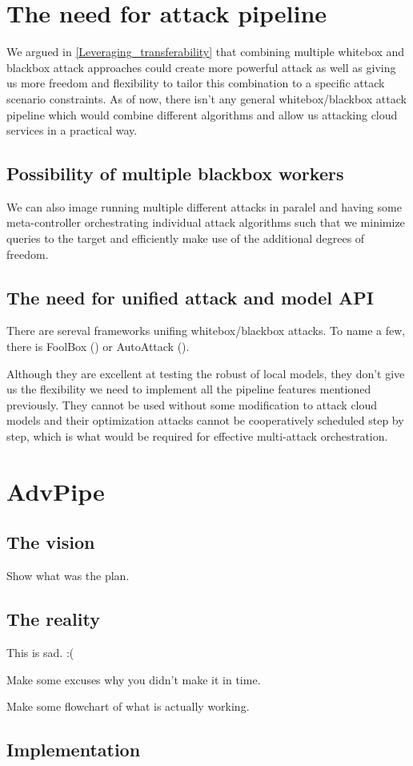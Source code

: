 \section{The need for attack pipeline}
We argued in \ref{Leveraging_transferability} that combining multiple whitebox and blackbox attack approaches could create more powerful attack as well as giving us more freedom and flexibility to tailor this combination to a specific attack scenario constraints. As of now, there isn't any general whitebox/blackbox attack pipeline which would combine different algorithms and allow us attacking cloud services in a practical way.

\subsection{Possibility of multiple blackbox workers}
We can also image running multiple different attacks in paralel and having some meta-controller orchestrating individual attack algorithms such that we minimize queries to the target and efficiently make use of the additional degrees of freedom.


\subsection{The need for unified attack and model API}
There are sereval frameworks unifing whitebox/blackbox attacks. To name a few, there is 
FoolBox (\cite{Rauber2020FoolboxNF}) or AutoAttack (\cite{DBLP:journals/corr/abs-2003-01690}). 

Although they are excellent at testing the robust of local models, they don't give us the flexibility we need to implement all the pipeline features mentioned previously. They cannot be used without some modification to attack cloud models and their optimization attacks cannot be cooperatively scheduled step by step, which is what would be required for effective multi-attack orchestration.

\section{AdvPipe}

\subsection{The vision}

Show what was the plan.

\subsection{The reality}
This is sad. :(

Make some excuses why you didn't make it in time.

Make some flowchart of what is actually working.


\subsection{Implementation}

